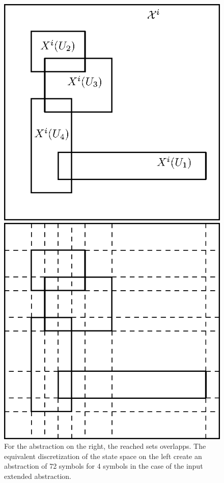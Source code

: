 \begin{figure}
\centering
\begin{minipage}[b]{0.49\textwidth}
	\includegraphics[width=\textwidth]{chapters/abstraction_reduction/overlapp_disc.eps}
\end{minipage}	
\begin{minipage}[b]{0.49\textwidth}
	\includegraphics[width=\textwidth]{chapters/abstraction_reduction/overlapp_disc2.eps}
\end{minipage}	
\caption{For the abstraction on the right, the reached sets overlapps. The equivalent discretization of the state space on the left create an abstraction of 72 symbols for 4 symbols in the case of the input extended abstraction.}
\label{fig:overlapp}
\end{figure}


